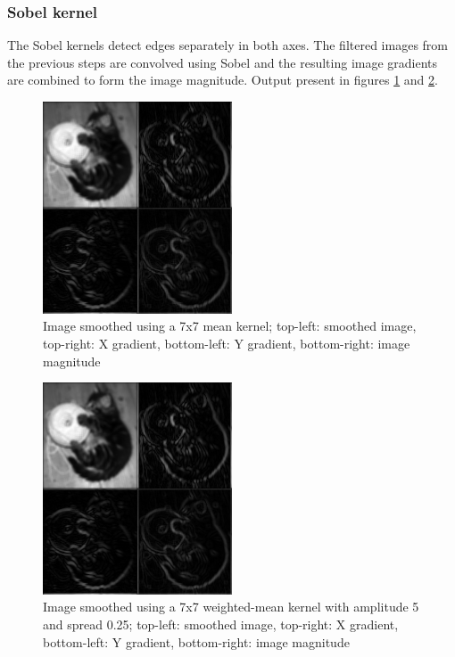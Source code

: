 \documentclass[12pt,a4paper]{article}
\begin{document}
\subsubsection*{Sobel kernel}

The Sobel kernels detect edges separately in both axes. The filtered images from the previous steps are convolved using Sobel and the resulting image gradients are combined to form the image magnitude. Output present in figures \ref{fig:msobel} and \ref{fig:gsobel}.

\begin{figure}[ht]
    \centering
    \includegraphics[width=0.5\textwidth]{msobel}
    \caption{Image smoothed using a 7x7 mean kernel; top-left: smoothed image, top-right: X gradient, bottom-left: Y gradient, bottom-right: image magnitude}
    \label{fig:msobel}
\end{figure}

\begin{figure}[ht]
    \centering
    \includegraphics[width=0.5\textwidth]{gsobel}
    \caption{Image smoothed using a 7x7 weighted-mean kernel with amplitude 5 and spread 0.25; top-left: smoothed image, top-right: X gradient, bottom-left: Y gradient, bottom-right: image magnitude}
    \label{fig:gsobel}
\end{figure}
\end{document}
